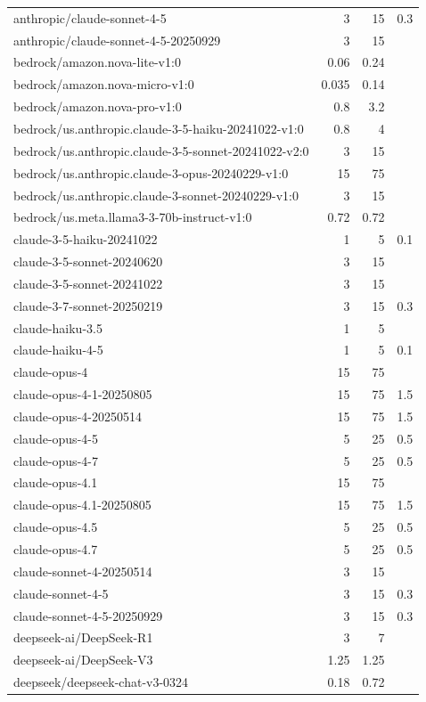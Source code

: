\begin{longtable}{lrrr}
anthropic/claude-sonnet-4-5 & 3 & 15 & 0.3 \\
anthropic/claude-sonnet-4-5-20250929 & 3 & 15 &  \\
bedrock/amazon.nova-lite-v1:0 & 0.06 & 0.24 &  \\
bedrock/amazon.nova-micro-v1:0 & 0.035 & 0.14 &  \\
bedrock/amazon.nova-pro-v1:0 & 0.8 & 3.2 &  \\
bedrock/us.anthropic.claude-3-5-haiku-20241022-v1:0 & 0.8 & 4 &  \\
bedrock/us.anthropic.claude-3-5-sonnet-20241022-v2:0 & 3 & 15 &  \\
bedrock/us.anthropic.claude-3-opus-20240229-v1:0 & 15 & 75 &  \\
bedrock/us.anthropic.claude-3-sonnet-20240229-v1:0 & 3 & 15 &  \\
bedrock/us.meta.llama3-3-70b-instruct-v1:0 & 0.72 & 0.72 &  \\
claude-3-5-haiku-20241022 & 1 & 5 & 0.1 \\
claude-3-5-sonnet-20240620 & 3 & 15 &  \\
claude-3-5-sonnet-20241022 & 3 & 15 &  \\
claude-3-7-sonnet-20250219 & 3 & 15 & 0.3 \\
claude-haiku-3.5 & 1 & 5 &  \\
claude-haiku-4-5 & 1 & 5 & 0.1 \\
claude-opus-4 & 15 & 75 &  \\
claude-opus-4-1-20250805 & 15 & 75 & 1.5 \\
claude-opus-4-20250514 & 15 & 75 & 1.5 \\
claude-opus-4-5 & 5 & 25 & 0.5 \\
claude-opus-4-7 & 5 & 25 & 0.5 \\
claude-opus-4.1 & 15 & 75 &  \\
claude-opus-4.1-20250805 & 15 & 75 & 1.5 \\
claude-opus-4.5 & 5 & 25 & 0.5 \\
claude-opus-4.7 & 5 & 25 & 0.5 \\
claude-sonnet-4-20250514 & 3 & 15 &  \\
claude-sonnet-4-5 & 3 & 15 & 0.3 \\
claude-sonnet-4-5-20250929 & 3 & 15 & 0.3 \\
deepseek-ai/DeepSeek-R1 & 3 & 7 &  \\
deepseek-ai/DeepSeek-V3 & 1.25 & 1.25 &  \\
deepseek/deepseek-chat-v3-0324 & 0.18 & 0.72 &  \\

\end{longtable}
